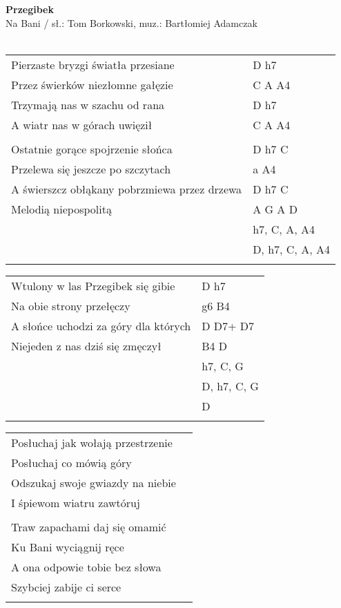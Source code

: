 \documentclass[a5paper]{article}
\begin{document}


\noindent
\fontsize{12pt}{15pt}\selectfont
\textbf{Przegibek} \\
\fontsize{8pt}{10pt}\selectfont
Na Bani / sł.: Tom Borkowski, muz.: Bartłomiej Adamczak\\ \\
\fontsize{10pt}{12pt}\selectfont
{}
\begin{tabular}{@{}p{8.00cm}p{3cm}@{}}
\noindent
Pierzaste bryzgi światła przesiane & D h7 \\
Przez świerków niezłomne gałęzie & C A A4 \\
Trzymają nas w szachu od rana & D h7 \\
A wiatr nas w górach uwięził & C A A4 \\ \\

Ostatnie gorące spojrzenie słońca & D h7 C \\
Przelewa się jeszcze po szczytach & a A4 \\
A świerszcz obłąkany pobrzmiewa przez drzewa & D h7 C \\
Melodią niepospolitą & A G A D \\
& h7, C, A, A4 \\
& D, h7, C, A, A4 \\ \\
\end{tabular}

\noindent
\begin{tabular}{@{}p{7.00cm}p{3cm}@{}}
Wtulony w las Przegibek się gibie & D h7 \\
Na obie strony przełęczy & g6 B4 \\
A słońce uchodzi za góry dla których & D D7+ D7 \\
Niejeden z nas dziś się zmęczył & B4 D \\
& h7, C, G \\
& D, h7, C, G \\
& D \\ \\
\end{tabular}

\noindent
\begin{tabular}{@{}p{8.00cm}p{3cm}@{}}
Posłuchaj jak wołają przestrzenie \\
Posłuchaj co mówią góry \\
Odszukaj swoje gwiazdy na niebie \\
I śpiewom wiatru zawtóruj \\ \\

Traw zapachami daj się omamić \\
Ku Bani wyciągnij ręce \\
A ona odpowie tobie bez słowa \\
Szybciej zabije ci serce \\ \\
\end{tabular}
\end{document}
